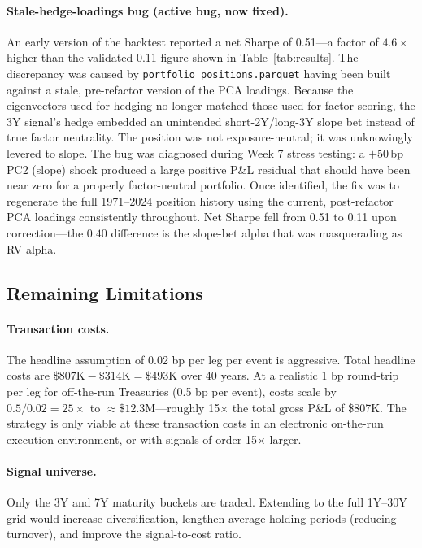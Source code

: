 \documentclass[11pt]{article}
\begin{document}
\paragraph{Stale-hedge-loadings bug (active bug, now fixed).}
An early version of the backtest reported a net Sharpe of 0.51---a factor of
$4.6\times$ higher than the validated 0.11 figure shown in Table~\ref{tab:results}.
The discrepancy was caused by \texttt{portfolio\_positions.parquet} having been
built against a stale, pre-refactor version of the PCA loadings. Because the
eigenvectors used for hedging no longer matched those used for factor scoring,
the 3Y signal's hedge embedded an unintended short-2Y/long-3Y slope bet
instead of true factor neutrality. The position was not exposure-neutral; it
was unknowingly levered to slope. The bug was diagnosed during Week 7 stress
testing: a $+50$\,bp PC2 (slope) shock produced a large positive P\&L
residual that should have been near zero for a properly factor-neutral
portfolio. Once identified, the fix was to regenerate the full 1971--2024
position history using the current, post-refactor PCA loadings consistently
throughout. Net Sharpe fell from 0.51 to 0.11 upon correction---the $0.40$
difference is the slope-bet alpha that was masquerading as RV alpha.

\subsection{Remaining Limitations}

\paragraph{Transaction costs.}
The headline assumption of 0.02 bp per leg per event is aggressive.
Total headline costs are $\$807\text{K} - \$314\text{K} = \$493\text{K}$
over 40 years. At a realistic 1 bp round-trip per leg for off-the-run
Treasuries (0.5 bp per event), costs scale by $0.5/0.02 = 25\times$ to
$\approx\$12.3$M---roughly 15$\times$ the total gross P\&L of \$807K.
The strategy is only viable at these transaction costs in an electronic
on-the-run execution environment, or with signals of order 15$\times$ larger.

\paragraph{Signal universe.}
Only the 3Y and 7Y maturity buckets are traded. Extending to the full
1Y--30Y grid would increase diversification, lengthen average holding
periods (reducing turnover), and improve the signal-to-cost ratio.
\end{document}
